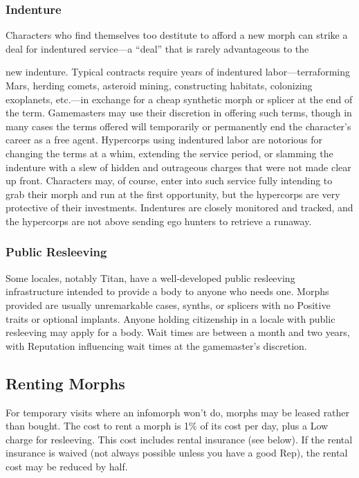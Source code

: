 \subsubsection{Indenture} 

Characters who find themselves too destitute to afford a new morph can strike a deal for indentured service—a ``deal'' that is rarely advantageous to the 

new indenture. Typical contracts require years of indentured labor—terraforming Mars, herding comets, asteroid mining, constructing habitats, colonizing exoplanets, etc.—in exchange for a cheap synthetic morph or splicer at the end of the term. Gamemasters may use their discretion in offering such terms, though in many cases the terms offered will temporarily or permanently end the character's career as a free agent. Hypercorps using indentured labor are notorious for changing the terms at a whim, extending the service period, or slamming the indenture with a slew of hidden and outrageous charges that were not made clear up front. Characters may, of course, enter into such service fully intending to grab their morph and run at the first opportunity, but the hypercorps are very protective of their investments. Indentures are closely monitored and tracked, and the hypercorps are not above sending ego hunters to retrieve a runaway. 

\subsubsection{Public Resleeving} 

Some locales, notably Titan, have a well-developed public resleeving infrastructure intended to provide a body to anyone who needs one. Morphs provided are usually unremarkable cases, synths, or splicers with no Positive traits or optional implants. Anyone holding citizenship in a locale with public resleeving may apply for a body. Wait times are between a month and two years, with Reputation influencing wait times at the gamemaster's discretion. 

\subsection{Renting Morphs} 

For temporary visits where an infomorph won't do, morphs may be leased rather than bought. The cost to rent a morph is 1\% of its cost per day, plus a Low charge for resleeving. This cost includes rental insurance (see below). If the rental insurance is waived (not always possible unless you have a good Rep), the rental cost may be reduced by half. 

